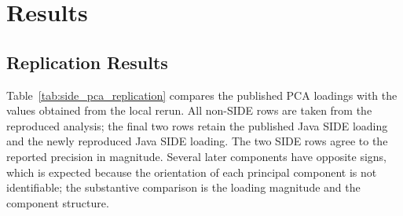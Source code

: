 \section{Results}
\subsection{Replication Results}

Table~\ref{tab:side_pca_replication} compares the published PCA loadings with the values obtained from the local rerun. All non-SIDE rows are taken from the reproduced analysis; the final two rows retain the published Java SIDE loading and the newly reproduced Java SIDE loading. The two SIDE rows agree to the reported precision in magnitude. Several later components have opposite signs, which is expected because the orientation of each principal component is not identifiable; the substantive comparison is the loading magnitude and the component structure.

